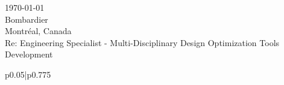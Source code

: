 \documentclass[12pt]{article} %
\begin{document}
\begin{paracol}{2} %


\parbox[top][0.1\textheight][c]{\linewidth}{ %
	\vspace{0.0\textheight} %
	\today\\[6pt]
	Bombardier\\
	Montr\'{e}al, Canada\\
	Re: Engineering Specialist - Multi-Disciplinary Design Optimization Tools Development\\[6pt] \medskip
}


\switchcolumn %


\parbox[top][0.1\textheight][c]{\linewidth}{ %
	\vspace{0\textheight} %
	\colorbox{shade}{ %
		\begin{supertabular}{p{0.05\linewidth}|p{0.775\linewidth}} %
			\ifthenelse{\equal{\cvdate}{}}{}{\raisebox{-1pt}{\faInfo} & \cvdate \\}
			\ifthenelse{\equal{\cvaddress}{}}{}{\raisebox{-1pt}{\faHome} & \cvaddress \\} %
			\ifthenelse{\equal{\cvaddress}{}}{}{\raisebox{-1pt}{\faPhone} & \cvnumberphone \\} %
		\end{supertabular}
	}
}


\end{paracol}
\end{document}
